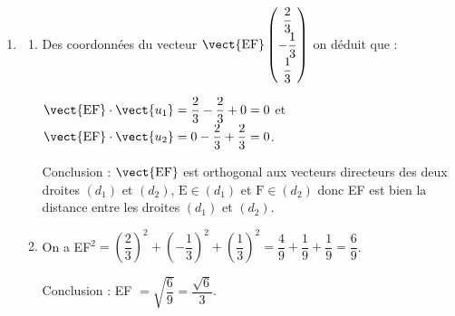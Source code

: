 \begin{enumerate}
\begin{enumerate}
$-2\times 0 + 1 + t + 5(2 + t) + 5 = 0 \iff 1 + t + 10 + 5t + 5 = 0\iff 6t + 16 = 0 \iff t = - \dfrac83$, d'où en remplaçant dans $x,\,y,\,$ et $z$, on obtient   F\:$\left(0~;~- \dfrac53~;~-\dfrac23\right)$.

Soit $(\delta)$ la droite passant par F et de vecteur directeur $\vect{w}$. On admet que les droites $(\delta)$ et $(d_1)$ sont sécantes en un point E de coordonnées $\left( -\dfrac23~;~- \dfrac43~;~-1\right)$.
	\end{enumerate}
\item 
	\begin{enumerate}
		\item %
Des coordonnées du vecteur $\vect{\text{EF}}\begin{pmatrix}\dfrac23\\-\dfrac13\\\dfrac13\end{pmatrix}$ on  déduit que :

$\vect{\text{EF}} \cdot \vect{u_1} = \dfrac23 - \dfrac23 + 0 = 0$ et 
$\vect{\text{EF}} \cdot \vect{u_2} = 0  - \dfrac23 + \dfrac23 = 0$.

Conclusion : $\vect{\text{EF}}$ est orthogonal aux vecteurs directeurs des deux droites $(d_1)$ et $(d_2)$, $\text{E} \in (d_1)$ et $\text{F} \in (d_2)$ donc EF est bien la distance entre les droites $(d_1)$ et $(d_2)$.
		\item %
		On a EF$^2 = \left(\dfrac23\right)^2 +  \left(-\dfrac13\right)^2 +  \left(\dfrac13 \right)^2  = \dfrac49 + \dfrac19 + \dfrac19 = \dfrac69$.
		
		Conclusion : EF $ = \sqrt{\dfrac69} = \dfrac{\sqrt{6}}{3}$.
	\end{enumerate}
\end{enumerate}
